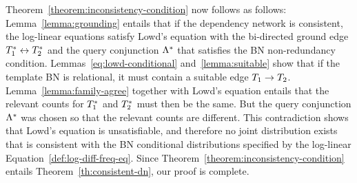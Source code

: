 \documentclass[runningheads,a4paper]{llncs}
\begin{document}
Theorem~\ref{theorem:inconsistency-condition} now follows as follows: Lemma~\ref{lemma:grounding} entails that if the dependency network is consistent, the log-linear equations satisfy Lowd's equation with the bi-directed ground edge $T_{1}^{*}\hspace{0.0ex} \leftrightarrow T_{2}^{*}\hspace{0.0ex}$ and the query conjunction $\Lambda^{*}\hspace{0.0ex}$ that satisfies the BN non-redundancy condition. Lemmas~\ref{eq:lowd-conditional} and~\ref{lemma:suitable} show that if the template BN is relational, it must contain a suitable edge $T_{1} \rightarrow T_{2}$. Lemma~\ref{lemma:family-agree} 
 together with Lowd's equation entails that the relevant counts for $T_{1}^{*}\hspace{0.0ex}$ and $T_{2}^{*}\hspace{0.0ex}$ must then be the same. But the query conjunction $\Lambda^{*}\hspace{0.0ex}$ was chosen so that the relevant counts are different. This contradiction shows that Lowd's equation is unsatisfiable, and therefore no joint distribution exists that is consistent with the BN conditional distributions specified by the log-linear Equation~\ref{def:log-diff-freq-eq}. Since Theorem~\ref{theorem:inconsistency-condition} entails Theorem~\ref{th:consistent-dn}, our proof is complete.


%

\end{document}
